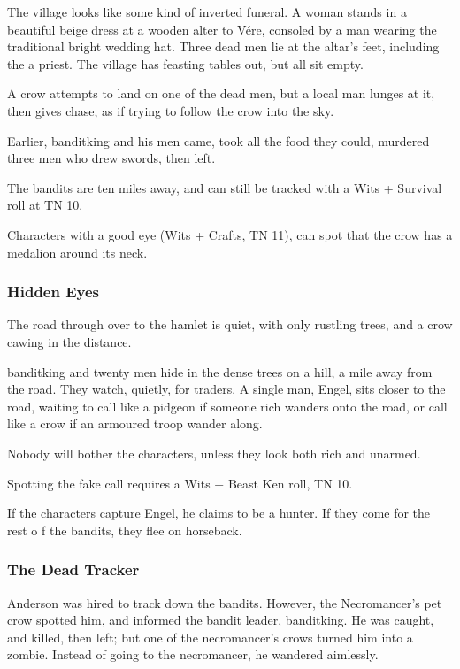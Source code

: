 \begin{boxtext}

	The village looks like some kind of inverted funeral.  A woman stands in a beautiful beige dress at a wooden alter to V\'{e}re, consoled by a man wearing the traditional bright wedding hat.  Three dead men lie at the altar's feet, including the a priest.  The village has feasting tables out, but all sit empty.

	A crow attempts to land on one of the dead men, but a local man lunges at it, then gives chase, as if trying to follow the crow into the sky.

\end{boxtext}

Earlier, \gls{banditking} and his men came, took all the food they could, murdered three men who drew swords, then left.

The bandits are ten miles away, and can still be tracked with a Wits + Survival roll at TN 10.

Characters with a good eye (Wits + Crafts, TN 11), can spot that the crow has a medalion around its neck.

\subsubsection{Hidden Eyes}
\begin{boxtext}
The road through over to the hamlet is quiet, with only rustling trees, and a crow cawing in the distance.
\end{boxtext}

\gls{banditking} and twenty men hide in the dense trees on a hill, a mile away from the road.  They watch, quietly, for traders.  A single man, Engel, sits closer to the road, waiting to call like a pidgeon if someone rich wanders onto the road, or call like a crow if an armoured troop wander along.

Nobody will bother the characters, unless they look both rich and unarmed.

Spotting the fake call requires a Wits + Beast Ken roll, TN 10.

If the characters capture Engel, he claims to be a hunter.  If they come for the rest o f the bandits, they flee on horseback.


\humansoldier

\subsubsection{The Dead Tracker}
Anderson was hired to track down the bandits.  However, the Necromancer's pet crow spotted him, and informed the bandit leader, \gls{banditking}.  He was caught, and killed, then left; but one of the necromancer's crows turned him into a zombie.  Instead of going to the necromancer, he wandered aimlessly.


